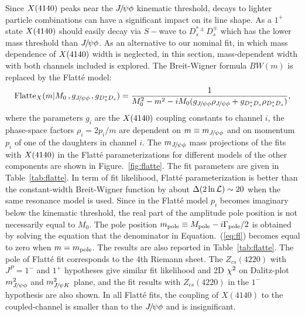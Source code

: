 Since $X(4140)$ peaks near the ${{J\mskip -3mu/\mskip -2mu\psi}}\phi$ kinematic threshold, 
decays to lighter particle combinations can have a significant impact on its line shape.
As a $1^+$ state $X(4140)$ should easily decay via $S-$wave to $D_s^{*\pm}D_s^{\mp}$ which has the lower mass threshold than ${{J\mskip -3mu/\mskip -2mu\psi}}\phi$.
As an alternative to our nominal fit, 
in which mass dependence of $X(4140)$ width is neglected, 
in this section,
mass-dependent width with both channels included is explored. 
The Breit-Wigner formula $BW(m)$ is replaced by the Flatt\'e model: 
\begin{equation}
{\rm Flatte}_X(m|M_0\,,g_{{{J\mskip -3mu/\mskip -2mu\psi}}\phi}\,,g_{D_s^*D_s})=\frac{1}{M_0^2-m^2-iM_0(g_{{{J\mskip -3mu/\mskip -2mu\psi}}\phi}\rho_{{{J\mskip -3mu/\mskip -2mu\psi}} \phi}+g_{D_s^*D_s}\rho_{D_s^*D_s})},
\label{eq:fl}
\end{equation}
where the parameters $g_i$ are the $X(4140)$ coupling constants to channel $i$, 
the phase-space factors $\rho_i=2p_i/m$ are dependent on $m\equiv m_{{{J\mskip -3mu/\mskip -2mu\psi}} \phi}$ and on momentum $p_i$ of one of the daughters in channel $i$. 
The $m_{{{J\mskip -3mu/\mskip -2mu\psi}} \phi}$ mass projections of the fits with $X(4140)$ in the Flatt\'e parameterizations for different models of the other components are shown in Figure.~\ref{fig:flatte}. 
The fit parameters are given in Table~\ref{tab:flatte}.  
In term of fit likelihood, 
Flatt\'e parameterization is better than the constant-width Breit-Wigner function by about $\Delta(2\ln\mathcal{L})\sim20$ when the same resonance model is used. 
Since in the Flatt\'e model $p_i$ becomes imaginary below the kinematic threshold, 
the real part of the amplitude pole position is not necessarily equal to $M_0$. 
The pole position $m_{\rm pole}\equiv M_{\rm pole}- i\Gamma_{\rm pole}/2$ is obtained by solving the equation that the denominator 
in Equation.~(\ref{eq:fl}) becomes equal to zero when $m=m_{\rm pole}$. 
The results are also reported in Table~\ref{tab:flatte}. 
The pole of Flatt\'e fit corresponds to the 4th Riemann sheet. 
The $Z_{cs}(4220)$ with $J^P=1^{-}$ and $1^+$ hypotheses give similar fit likelihood and 2D $\chi^2$ on Dalitz-plot $m^2_{{{J\mskip -3mu/\mskip -2mu\psi}}\phi}$ and $m^2_{{{J\mskip -3mu/\mskip -2mu\psi}} K}$ plane, 
and the fit results with $Z_{cs}(4220)$ in the $1^-$ hypothesis are also shown.
In all Flatt\'e fits, 
the coupling of $X(4140)$ to the coupled-channel is smaller than to the ${{J\mskip -3mu/\mskip -2mu\psi}}\phi$ and is insignificant. 


